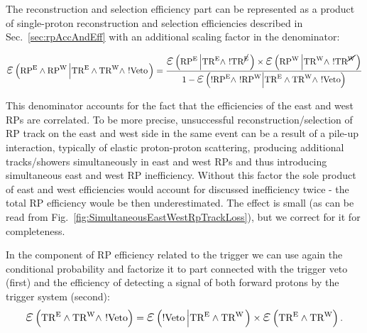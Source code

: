 The reconstruction and selection efficiency part can be represented as a product of single-proton reconstruction and selection efficiencies described in Sec.~\ref{sec:rpAccAndEff} with an additional scaling factor in the denominator:


\begin{equation}
\mbox{\LARGE$\varepsilon$}\left(\RPE\land\RPW\left|\TRE\land\TRW\land~!\V\right.\right)=\frac{\mbox{\LARGE$\varepsilon$}\left(\RPE\left|\TRE\land~!\TRNE\right.\right) \times \mbox{\LARGE$\varepsilon$}\left(\RPW\left|\TRW\land~!\TRNW\right.\right)}{1-\mbox{\LARGE$\varepsilon$}\left(!\RPE\land~!\RPW\Big|\TRE\land\TRW\land~!\V\Big.\right)}
\end{equation}

This denominator accounts for the fact that the efficiencies of the east and west RPs are correlated. To be more precise, unsuccessful reconstruction/selection of RP track on the east and west side in the same event can be a result of a pile-up interaction, typically of elastic proton-proton scattering, producing additional tracks/showers simultaneously in east and west RPs and thus introducing simultaneous east and west RP inefficiency. Without this factor the sole product of east and west efficiencies would account for discussed inefficiency twice - the total RP efficiency woule be then underestimated. The effect is small (as can be read from Fig.~\ref{fig:SimultaneousEastWestRpTrackLoss}), but we correct for it for completeness.


In the component of RP efficiency related to the trigger we can use again the conditional probability and factorize it to part connected with the trigger veto (first) and the efficiency of detecting a signal of both forward protons by the trigger system (second):
\begin{equation}
\mbox{\LARGE$\varepsilon$}\left(\TRE\land\TRW\land~!\V\right) = \mbox{\LARGE$\varepsilon$}\left(!\V\left|\TRE\land\TRW\right.\right)\times\mbox{\LARGE$\varepsilon$}\left(\TRE\land\TRW\right).
\end{equation}

